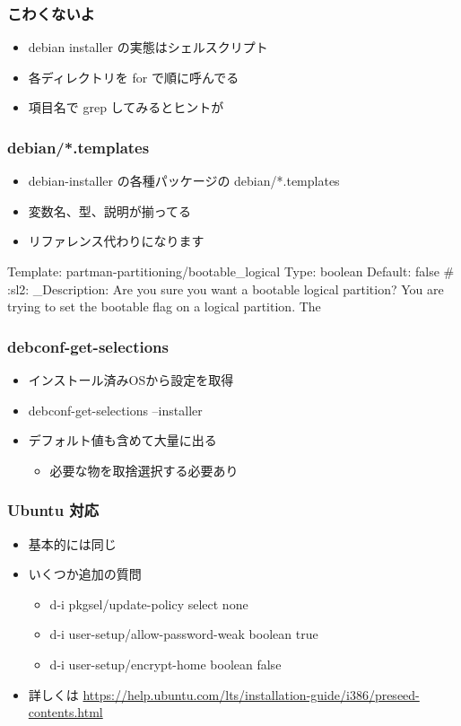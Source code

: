 \documentclass[mingoth,a4paper]{jsarticle}
\begin{document}
\subsubsection{こわくないよ}
\begin{itemize}
\item debian installer の実態はシェルスクリプト
\item 各ディレクトリを for で順に呼んでる
\item 項目名で grep してみるとヒントが
\end{itemize}

\subsubsection{debian/*.templates}
\begin{itemize}
\item debian-installer の各種パッケージの debian/*.templates
\item 変数名、型、説明が揃ってる
\item リファレンス代わりになります
\end{itemize}

\begin{commandline}
Template: partman-partitioning/bootable_logical
Type: boolean
Default: false
# :sl2:
_Description: Are you sure you want a bootable logical partition?
 You are trying to set the bootable flag on a logical partition. The
\end{commandline}

\subsubsection{debconf-get-selections}
\begin{itemize}
\item インストール済みOSから設定を取得
\item debconf-get-selections --installer
\item デフォルト値も含めて大量に出る
  \begin{itemize}
  \item 必要な物を取捨選択する必要あり
  \end{itemize}
\end{itemize}

\subsubsection{Ubuntu 対応}
\begin{itemize}
\item 基本的には同じ
\item いくつか追加の質問
  \begin{itemize}
  \item d-i pkgsel/update-policy select none
  \item d-i user-setup/allow-password-weak boolean true
  \item d-i user-setup/encrypt-home boolean false
  \end{itemize}
\item 詳しくは \url{https://help.ubuntu.com/lts/installation-guide/i386/preseed-contents.html}
\end{itemize}
\end{document}
